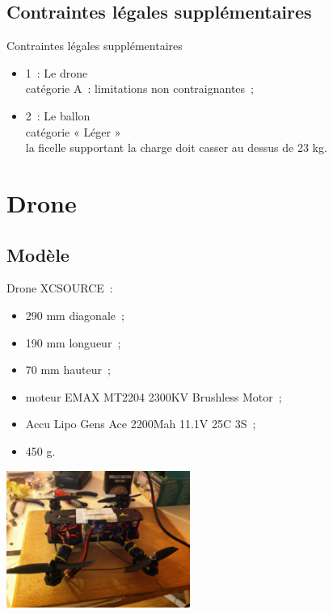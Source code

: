 \documentclass{beamer}
\begin{document}
\subsection{Contraintes légales supplémentaires}
\begin{frame}{Contraintes légales supplémentaires}
  \begin{itemize}
    \item 1~: Le drone \\
	    catégorie A~: limitations non contraignantes~;
    \item 2~: Le ballon \\
	    catégorie « Léger » \\
	    la ficelle supportant la charge doit casser au dessus de 23 kg.
 \end{itemize}
\end{frame}


\section{Drone}

\subsection{Modèle}

\begin{frame}
  \begin{multicols}{2}
    Drone XCSOURCE~: \\
    \begin{itemize}
      \item 290 mm diagonale~;
      \item 190 mm longueur~;
      \item 70 mm hauteur~;
      \item moteur EMAX MT2204 2300KV Brushless Motor~;
      \item Accu Lipo Gens Ace 2200Mah 11.1V 25C 3S~;
      \item 450 g.
    \end{itemize}
    \newpage
    \begin{center}
      \includegraphics[width=6cm]{../Images/drone.JPG}
    \end{center}
  \end{multicols}
\end{frame}
\end{document}
